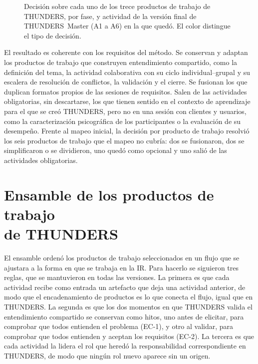 \documentclass[12pt,letterpaper,oneside]{report}
\begin{document}
\begin{figure}[H]
\caption{Decisión sobre cada uno de los trece productos de trabajo de THUNDERS, por fase,
y actividad de la versión final de THUNDERS~Master (A1 a A6) en la que quedó. El
color distingue el tipo de decisión.}
\label{fig:decisiones}
\end{figure}

El resultado es coherente con los requisitos del método. Se conservan y adaptan
los productos de trabajo que construyen entendimiento compartido, como la definición del tema, la
actividad colaborativa con su ciclo individual--grupal y su escalera de
resolución de conflictos, la validación y el cierre. Se fusionan los que duplican formatos
propios de las sesiones de requisitos. Salen de las actividades obligatorias,
sin descartarse, los que tienen sentido en el contexto de aprendizaje para el
que se creó THUNDERS, pero no en una sesión con clientes y usuarios, como la
caracterización psicográfica de los participantes o la evaluación de su
desempeño. Frente al mapeo inicial, la decisión por producto de trabajo resolvió los seis
productos de trabajo que el mapeo no cubría: dos se fusionaron, dos se simplificaron o se
dividieron, uno quedó como opcional y uno salió de las actividades
obligatorias.


\section[Ensamble de los productos de trabajo de THUNDERS]{Ensamble de los productos de trabajo\\ de THUNDERS}
\label{sec:ensamble}
El ensamble ordenó los productos de trabajo seleccionados en un flujo que se ajustara a la
forma en que se trabaja en la IR. Para hacerlo se siguieron tres reglas, que se
mantuvieron en todas las versiones. La primera es que cada actividad recibe como
entrada un artefacto que deja una actividad anterior, de modo que el
encadenamiento de productos es lo que conecta el flujo, igual que en THUNDERS.
La segunda es que los dos momentos en que THUNDERS valida el entendimiento
compartido se conservan como hitos, uno antes de elicitar, para comprobar que
todos entienden el problema (EC-1), y otro al validar, para comprobar que todos
entienden y aceptan los requisitos (EC-2). La tercera es que cada actividad la
lidera el rol que heredó la responsabilidad correspondiente en THUNDERS, de modo
que ningún rol nuevo aparece sin un origen.
\end{document}
